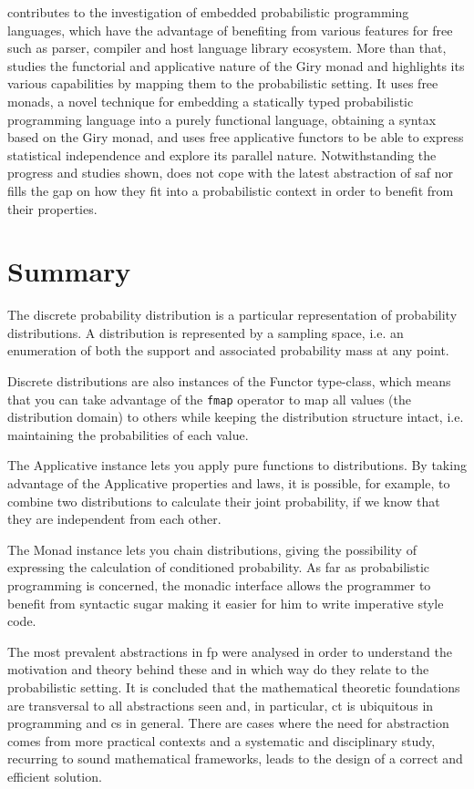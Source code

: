 \documentclass[
  oneside,
  11pt, a4paper,
  footinclude=true,
  headinclude=true,
  cleardoublepage=empty
]{scrbook}
\theoremstyle{definition}
\theoremstyle{definition}
\begin{document}
        \cite{jtobin} contributes to the investigation of embedded probabilistic programming languages, which have the advantage of benefiting from various features for free such as parser, compiler and host language library ecosystem. More than that, \cite{jtobin} studies the functorial and applicative nature of the Giry monad and highlights its various capabilities by mapping them to the probabilistic setting. It uses free monads, a novel technique for embedding a statically typed probabilistic programming language into a purely functional language, obtaining a syntax based on the Giry monad, and uses free applicative functors to be able to express statistical independence and explore its parallel nature. Notwithstanding the progress and studies shown, \cite{jtobin} does not cope with the latest abstraction of \gls{saf} nor fills the gap on how they fit into a probabilistic context in order to benefit from their properties.
        
    \section{Summary}\label{sec-summary}
    
    The discrete probability distribution is a particular representation of probability distributions. A distribution is represented by a sampling space, i.e. an enumeration of both the support and associated probability mass at any point.
    
    Discrete distributions are also instances of the Functor type-class, which means that you can take advantage of the \texttt{fmap} operator to map all values (the distribution domain) to others while keeping the distribution structure intact, i.e. maintaining the probabilities of each value.
        
    The Applicative instance lets you apply pure functions to distributions. By taking advantage of the Applicative properties and laws, it is possible, for example, to combine two distributions to calculate their joint probability, if we know that they are independent from each other.
        
    The Monad instance lets you chain distributions, giving the possibility of expressing the calculation of conditioned probability. As far as probabilistic programming is concerned, the monadic interface allows the programmer to benefit from syntactic sugar making it easier for him to write imperative style code.
    
    The most prevalent abstractions in \gls{fp} were analysed in order to understand the motivation and theory behind these and in which way do they relate to the probabilistic setting. It is concluded that the mathematical theoretic foundations are transversal to all abstractions seen and, in particular, \gls{ct} is ubiquitous in programming and \gls{cs} in general. There are cases where the need for abstraction comes from more practical contexts and a systematic and disciplinary study, recurring to sound mathematical frameworks, leads to the design of a correct and efficient solution.
    
\end{document}
